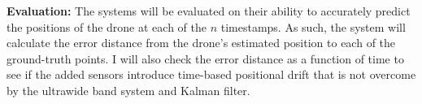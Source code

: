 \textbf{Evaluation:}
The systems will be evaluated on their ability to accurately predict the positions of the drone
at each of the $n$ timestamps.
As such, the system will calculate the error distance from the drone's estimated position to each of the
ground-truth points.
I will also check the error distance as a function of time to see if the added sensors introduce
time-based positional drift that is not overcome by the ultrawide band system and Kalman filter.
